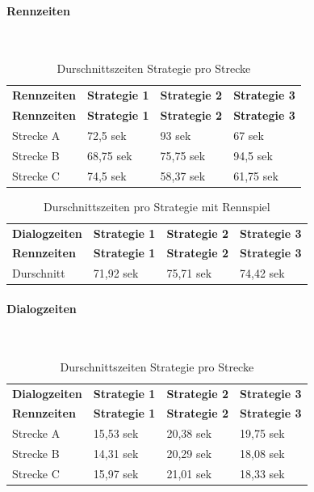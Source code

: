 \documentclass[12pt,a4paper]{scrartcl}
\begin{document}
\paragraph{Rennzeiten}
~\\
\begin{longtable}{p{3cm}p{3cm}p{3cm}p{3cm} }
	\label{durchschnittsvorl}\\
	\caption[Durschnittszeiten Strategie pro Strecke]{Durschnittszeiten Strategie pro Strecke}\\
	\hline
	\textbf{Rennzeiten}&\textbf{Strategie 1}&\textbf{Strategie 2} &\textbf{Strategie 3}\\
	\hline
	\endfirsthead
	\hline
	\textbf{Rennzeiten}&\textbf{Strategie 1}&\textbf{Strategie 2} &\textbf{Strategie 3}\\
	\hline
	\endhead
Strecke A & 72,5 sek & 93 sek & 67 sek \\
Strecke B & 68,75 sek & 75,75 sek & 94,5 sek \\
Strecke C & 74,5 sek & 58,37 sek & 61,75 sek \\

\hline
\end{longtable}

\begin{longtable}{p{3cm}p{3cm}p{3cm}p{3cm} }
	\label{Dialogzeiten}\\
	\caption[Durschnittszeiten pro Strategie mit Rennspiel]{Durschnittszeiten pro Strategie mit Rennspiel}\\
	\hline
	\textbf{Dialogzeiten}&\textbf{Strategie 1}&\textbf{Strategie 2} &\textbf{Strategie 3}\\
	\hline
	\endfirsthead
	\hline
	\textbf{Rennzeiten}&\textbf{Strategie 1}&\textbf{Strategie 2} &\textbf{Strategie 3}\\
	\hline
	\endhead
Durschnitt & 71,92 sek &75,71 sek & 74,42 sek \\


\hline
\end{longtable}



\paragraph{Dialogzeiten}
~\\

\begin{longtable}{p{3cm}p{3cm}p{3cm}p{3cm} }
	\label{durchschnittsvorl}\\
	\caption[Durschnittszeiten Strategie pro Strecke]{Durschnittszeiten Strategie pro Strecke}\\
	\hline
	\textbf{Dialogzeiten}&\textbf{Strategie 1}&\textbf{Strategie 2} &\textbf{Strategie 3}\\
	\hline
	\endfirsthead
	\hline
	\textbf{Rennzeiten}&\textbf{Strategie 1}&\textbf{Strategie 2} &\textbf{Strategie 3}\\
	\hline
	\endhead
Strecke A & 15,53 sek & 20,38 sek & 19,75 sek \\
Strecke B & 14,31 sek & 20,29 sek & 18,08 sek \\
Strecke C  & 15,97 sek & 21,01 sek & 18,33 sek \\

\hline
\end{longtable}
\end{document}
